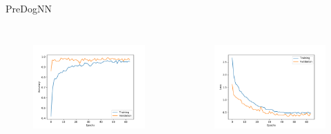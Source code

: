   \begin{frame}{PreDogNN}
    \begin{columns}[c]
      \begin{figure}
        \centering
        \includegraphics[width=\textwidth]{logos/PreDogNN/history_acc_pre.pdf}
        \label{fig:acc_pre}
      \end{figure}
      \begin{figure}
        \centering
        \includegraphics[width=\textwidth]{logos/PreDogNN/history_loss_pre.pdf}
        \label{fig:loss_pre}
      \end{figure}
    \end{columns}
  \end{frame}

